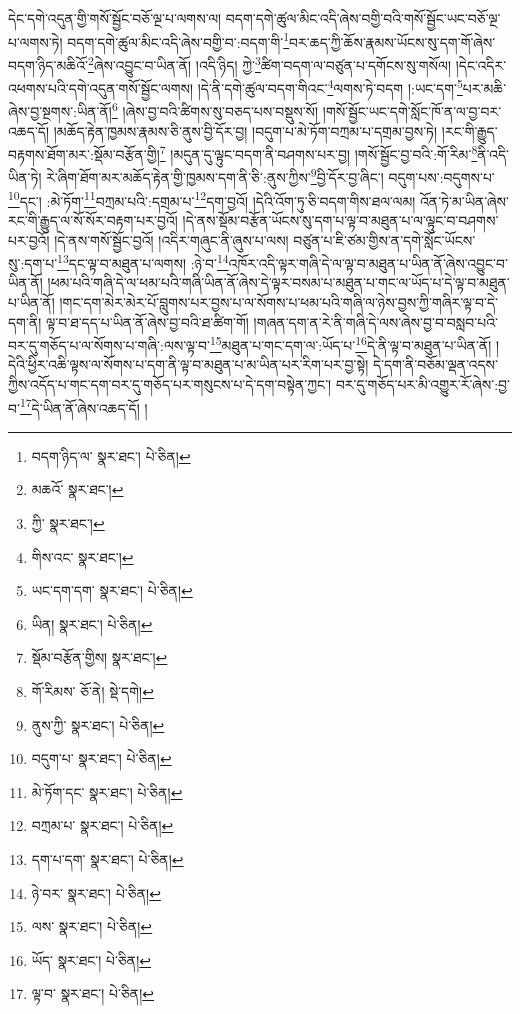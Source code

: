 དེང་དགེ་འདུན་གྱི་གསོ་སྦྱོང་བཅོ་ལྔ་པ་ལགས་ལ། བདག་དགེ་ཚུལ་མིང་འདི་ཞེས་བགྱི་བའི་གསོ་སྦྱོང་ཡང་བཅོ་ལྔ་པ་ལགས་ཏེ། བདག་དགེ་ཚུལ་མིང་འདི་ཞེས་བགྱི་བ་:བདག་གི་\footnote{བདག་ཉིད་ལ་  སྣར་ཐང་།  པེ་ཅིན། }བར་ཆད་ཀྱི་ཆོས་རྣམས་ཡོངས་སུ་དག་གོ་ཞེས་བདག་ཉིད་མཆིའོ་\footnote{མཆའོ་  སྣར་ཐང་། }ཞེས་འབྱུང་བ་ཡིན་ནོ། །འདི་ཉིད། ཀྱེ་\footnote{ཀྱི་  སྣར་ཐང་། }ཚིག་བདག་ལ་བཙུན་པ་དགོངས་སུ་གསོལ། །དེང་འདིར་འཕགས་པའི་དགེ་འདུན་གསོ་སྦྱོང་ལགས། །དེ་ནི་དགེ་ཚུལ་བདག་གིའང་\footnote{གིས་འང་  སྣར་ཐང་། }ལགས་ཏེ་བདག །:ཡང་དག་\footnote{ཡང་དག་དག་  སྣར་ཐང་།  པེ་ཅིན། }པར་མཆི་ཞེས་བྱ་སྔགས་:ཡིན་ནོ།\footnote{ཡིན།  སྣར་ཐང་།  པེ་ཅིན། } །ཞེས་བྱ་བའི་ཚིགས་སུ་བཅད་པས་བསྡུས་སོ། །གསོ་སྦྱོང་ཡང་དགེ་སློང་ཁོ་ན་ལ་བྱ་བར་འཆད་དོ། །མཆོད་རྟེན་ཁྱམས་རྣམས་ཅི་ནུས་བྱི་དོར་བྱ། །བདུག་པ་མེ་ཏོག་བཀྲམ་པ་དགྲམ་བྱས་ཏེ། །རང་གི་རྒྱུད་བརྟགས་ཐོག་མར་:སྡོམ་བརྩོན་གྱི།\footnote{སྡོམ་བརྩོན་གྱིས།  སྣར་ཐང་། } །མདུན་དུ་ལྟུང་བདག་ནི་བཤགས་པར་བྱ། །གསོ་སྦྱོང་བྱ་བའི་:གོ་རིམ་\footnote{གོ་རིམས་  ཅོ་ནེ།  སྡེ་དགེ། }ནི་འདི་ཡིན་ཏེ། རེ་ཞིག་ཐོག་མར་མཆོད་རྟེན་གྱི་ཁྱམས་དག་ནི་ཅི་:ནུས་ཀྱིས་\footnote{ནུས་ཀྱི་  སྣར་ཐང་།  པེ་ཅིན། }བྱི་དོར་བྱ་ཞིང་། བདུག་པས་:བདུགས་པ་\footnote{བདུག་པ་  སྣར་ཐང་།  པེ་ཅིན། }དང་། :མེ་ཏོག་\footnote{མེ་ཏོག་དང་  སྣར་ཐང་།  པེ་ཅིན། }བཀྲམ་པའི་:དགྲམ་པ་\footnote{བཀྲམ་པ་  སྣར་ཐང་།  པེ་ཅིན། }དག་བྱའོ། །དེའི་འོག་ཏུ་ཅི་བདག་གིས་ཐལ་ལམ། འོན་ཏེ་མ་ཡིན་ཞེས་རང་གི་རྒྱུད་ལ་སོ་སོར་བརྟག་པར་བྱའོ། །དེ་ནས་སྡོམ་བརྩོན་ཡོངས་སུ་དག་པ་ལྟ་བ་མཐུན་པ་ལ་ལྟུང་བ་བཤགས་པར་བྱའོ། །དེ་ནས་གསོ་སྦྱོང་བྱའོ། །འདིར་གཞུང་ནི་ཞུས་པ་ལས། བཙུན་པ་ཇི་ཙམ་གྱིས་ན་དགེ་སློང་ཡོངས་སུ་:དག་པ་\footnote{དག་པ་དག་  སྣར་ཐང་།  པེ་ཅིན། }དང་ལྟ་བ་མཐུན་པ་ལགས། :ཉེ་བ་\footnote{ཉེ་བར་  སྣར་ཐང་།  པེ་ཅིན། }འཁོར་འདི་ལྟར་གཞི་དེ་ལ་ལྟ་བ་མཐུན་པ་ཡིན་ནོ་ཞེས་འབྱུང་བ་ཡིན་ནོ། །ཕམ་པའི་གཞི་དེ་ལ་ཕམ་པའི་གཞི་ཡིན་ནོ་ཞེས་དེ་ལྟར་བསམ་པ་མཐུན་པ་གང་ལ་ཡོད་པ་དེ་ལྟ་བ་མཐུན་པ་ཡིན་ནོ། །གང་དག་མེར་མེར་པོ་བླུགས་པར་བྱས་པ་ལ་སོགས་པ་ཕམ་པའི་གཞི་ལ་ཉེས་བྱས་ཀྱི་གཞིར་ལྟ་བ་དེ་དག་ནི། ལྟ་བ་ཐ་དད་པ་ཡིན་ནོ་ཞེས་བྱ་བའི་ཐ་ཚིག་གོ། །གཞན་དག་ན་རེ་ནི་གཞི་དེ་ལས་ཞེས་བྱ་བ་བསླབ་པའི་བར་དུ་གཅོད་པ་ལ་སོགས་པ་གཞི་:ལས་ལྟ་བ་\footnote{ལས་  སྣར་ཐང་།  པེ་ཅིན། }མཐུན་པ་གང་དག་ལ་:ཡོད་པ་\footnote{ཡོད་  སྣར་ཐང་།  པེ་ཅིན། }དེ་ནི་ལྟ་བ་མཐུན་པ་ཡིན་ནོ། །དེའི་ཕྱིར་འཆི་ལྟས་ལ་སོགས་པ་དག་ནི་ལྟ་བ་མཐུན་པ་མ་ཡིན་པར་རིག་པར་བྱ་སྟེ། དེ་དག་ནི་བཅོམ་ལྡན་འདས་ཀྱིས་འདོད་པ་གང་དག་བར་དུ་གཅོད་པར་གསུངས་པ་དེ་དག་བསྟེན་ཀྱང་། བར་དུ་གཅོད་པར་མི་འགྱུར་རོ་ཞེས་:བྱ་བ་\footnote{ལྟ་བ་  སྣར་ཐང་།  པེ་ཅིན། }དེ་ཡིན་ནོ་ཞེས་འཆད་དོ། །
